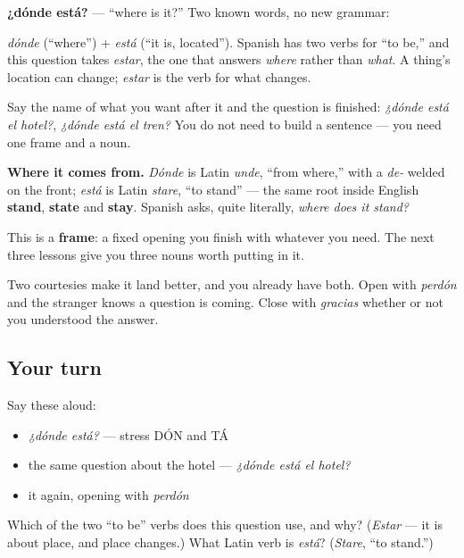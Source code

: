 \begin{cousinweb}
\textbf{¿dónde está?} — \textquotedblleft{}where is it?\textquotedblright{} Two known words, no new grammar:

\emph{dónde} (\textquotedblleft{}where\textquotedblright{}) + \emph{está} (\textquotedblleft{}it is, located\textquotedblright{}). Spanish has two verbs for \textquotedblleft{}to be,\textquotedblright{} and this question takes \emph{estar}, the one that answers \emph{where} rather than \emph{what}. A thing's location can change; \emph{estar} is the verb for what changes.

Say the name of what you want after it and the question is finished: \emph{¿dónde está el hotel?}, \emph{¿dónde está el tren?} You do not need to build a sentence — you need one frame and a noun.

\textbf{Where it comes from.} \emph{Dónde} is Latin \emph{unde}, \textquotedblleft{}from where,\textquotedblright{} with a \emph{de-} welded on the front; \emph{está} is Latin \emph{stare}, \textquotedblleft{}to stand\textquotedblright{} — the same root inside English \textbf{stand}, \textbf{state} and \textbf{stay}. Spanish asks, quite literally, \emph{where does it stand?}
\end{cousinweb}

\begin{grammarlens}[title={What you've built}]
This is a \textbf{frame}: a fixed opening you finish with whatever you need. The next three lessons give you three nouns worth putting in it.

Two courtesies make it land better, and you already have both. Open with \emph{perdón} and the stranger knows a question is coming. Close with \emph{gracias} whether or not you understood the answer.
\end{grammarlens}

\subsection*{Your turn}
Say these aloud:

\begin{itemize}
\raggedright
  \item \emph{¿dónde está?} — stress DÓN and TÁ
  \item the same question about the hotel — \emph{¿dónde está el hotel?}
  \item it again, opening with \emph{perdón}
\end{itemize}

\begin{tcolorbox}[breakable,colback=teal!4,colframe=teal!35!black,title={Before you move on}]
Which of the two \textquotedblleft{}to be\textquotedblright{} verbs does this question use, and why? (\emph{Estar} — it is about place, and place changes.) What Latin verb is \emph{está}? (\emph{Stare}, \textquotedblleft{}to stand.\textquotedblright{})
\end{tcolorbox}
